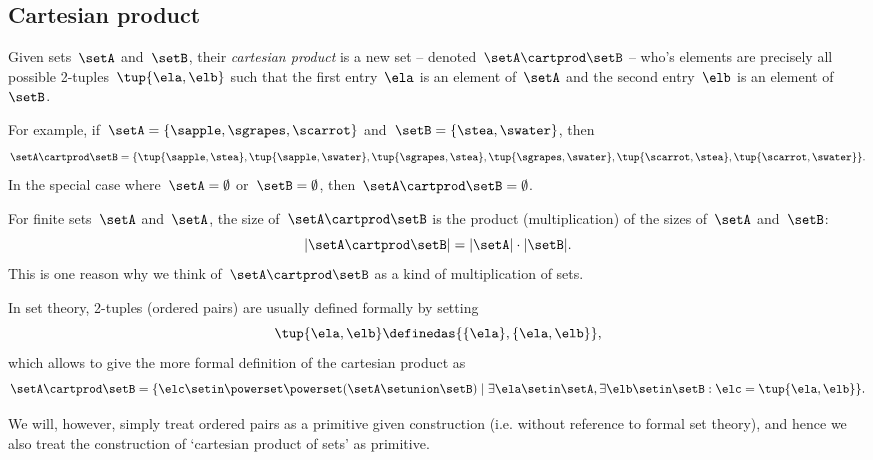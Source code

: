 \subsection{Cartesian product}\label{sec:cartesian-product}

Given sets~$\setA$ and~$\setB$, their \emph{cartesian product} is a new set -- denoted~$\setA \cartprod \setB$ -- who's elements are precisely all possible 2-tuples~$\tup{\ela, \elb}$ such that the first entry~$\ela$ is an element of~$\setA$ and the second entry~$\elb$ is an element of~$\setB$.

For example, if~$\setA = \{ \sapple, \sgrapes, \scarrot\}$ and~$\setB = \{ \stea, \swater \}$, then
\begin{equation*}
    \setA \cartprod \setB = \{ \tup{\sapple, \stea}, \tup{\sapple, \swater}, \tup{\sgrapes, \stea}, \tup{\sgrapes, \swater},  \tup{\scarrot, \stea}, \tup{\scarrot, \swater}\}.
\end{equation*}
In the special case where~$\setA = \emptyset$ or~$\setB = \emptyset$, then~$\setA \cartprod \setB = \emptyset$.

\begin{remark}
    For finite sets~$\setA$ and~$\setA$, the size of~$\setA \cartprod \setB$ is the product (multiplication) of the sizes of~$\setA$ and~$\setB$:
    \begin{equation*}
        \vert \setA \cartprod \setB \vert = \vert \setA \vert \cdot \vert \setB \vert.
    \end{equation*}
    This is one reason why we think of~$\setA \cartprod \setB$ as a kind of multiplication of sets.
\end{remark}

In set theory, 2-tuples (ordered pairs) are usually defined formally by setting
\begin{equation}
    \label{eq:ordered-pair}
    \tup{\ela, \elb} \definedas \{ \{\ela \} , \{ \ela, \elb \} \},
\end{equation}
which allows to give the more formal definition of the cartesian product as
\begin{equation}
    \setA \cartprod \setB = \{ \elc \setin\powerset \powerset (\setA \setunion \setB) \mid \exists \ela \setin\setA, \exists \elb \setin\setB : \elc = \tup{\ela, \elb} \}.
\end{equation}

We will, however, simply treat ordered pairs as a primitive given construction (i.e. without reference to formal set theory), and hence we also treat the construction of `cartesian product of sets' as primitive.

